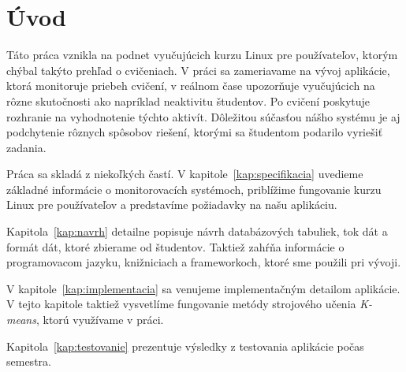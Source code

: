 \chapter*{Úvod} %



Táto práca vznikla na podnet vyučujúcich kurzu Linux pre používateľov, ktorým chýbal
takýto prehľad o cvičeniach. V práci sa zameriavame na vývoj aplikácie, ktorá
monitoruje priebeh cvičení, v reálnom čase upozorňuje vyučujúcich na rôzne skutočnosti
ako napríklad neaktivitu študentov.
Po cvičení poskytuje rozhranie na vyhodnotenie týchto aktivít. Dôležitou súčasťou
nášho systému je aj podchytenie rôznych spôsobov riešení, ktorými  sa študentom
podarilo vyriešiť zadania.

Práca sa skladá z niekoľkých častí. V kapitole~\ref{kap:specifikacia} uvedieme základné
informácie o monitorovacích systémoch, priblížime fungovanie kurzu Linux pre používateľov
a predstavíme požiadavky na našu aplikáciu.

Kapitola~\ref{kap:navrh} detailne popisuje návrh databázových tabuliek, tok dát a
formát dát, ktoré zbierame od študentov. Taktiež zahŕňa informácie o programovacom jazyku,
knižniciach a frameworkoch, ktoré sme použili pri vývoji.

V kapitole~\ref{kap:implementacia} sa venujeme implementačným detailom aplikácie. V tejto
kapitole taktiež vysvetlíme fungovanie metódy strojového učenia \textit{K-means}, ktorú
využívame v práci.

Kapitola~\ref{kap:testovanie} prezentuje výsledky z testovania aplikácie počas semestra.